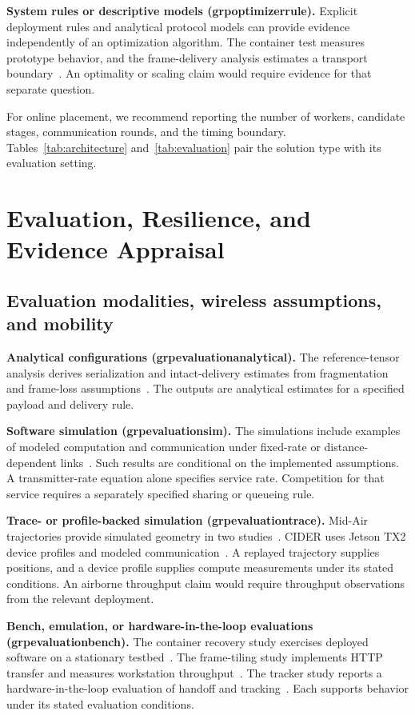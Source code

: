 \documentclass[pdflatex,sn-vancouver-num]{sn-jnl}
\newcommand{\groupcite}[2]{\csname grp#1#2\endcsname}
\begin{document}
\textbf{System rules or descriptive models (\groupcite{optimizer}{rule}).}
Explicit deployment rules and analytical protocol models can provide evidence independently of an optimization algorithm. The container test measures prototype behavior, and the frame-delivery analysis estimates a transport boundary~\cite{R0038,R0121}. An optimality or scaling claim would require evidence for that separate question.

For online placement, we recommend reporting the number of workers, candidate stages, communication rounds, and the timing boundary. Tables~\ref{tab:architecture} and~\ref{tab:evaluation} pair the solution type with its evaluation setting.
\FloatBarrier


\section{Evaluation, Resilience, and Evidence Appraisal}\label{sec:evaluation}
\subsection{Evaluation modalities, wireless assumptions, and mobility}
\textbf{Analytical configurations (\groupcite{evaluation}{analytical}).}
The reference-tensor analysis derives serialization and intact-delivery estimates from fragmentation and frame-loss assumptions~\cite{R0121}. The outputs are analytical estimates for a specified payload and delivery rule.

\textbf{Software simulation (\groupcite{evaluation}{sim}).}
The simulations include examples of modeled computation and communication under fixed-rate or distance-dependent links~\cite{R0015,R0022}. Such results are conditional on the implemented assumptions. A transmitter-rate equation alone specifies service rate. Competition for that service requires a separately specified sharing or queueing rule.

\textbf{Trace- or profile-backed simulation (\groupcite{evaluation}{trace}).}
Mid-Air trajectories provide simulated geometry in two studies~\cite{R0003,R0010}. CIDER uses Jetson TX2 device profiles and modeled communication~\cite{R0075}. A replayed trajectory supplies positions, and a device profile supplies compute measurements under its stated conditions. An airborne throughput claim would require throughput observations from the relevant deployment.

\textbf{Bench, emulation, or hardware-in-the-loop evaluations (\groupcite{evaluation}{bench}).}
The container recovery study exercises deployed software on a stationary testbed~\cite{R0038}. The frame-tiling study implements HTTP transfer and measures workstation throughput~\cite{R0125}. The tracker study reports a hardware-in-the-loop evaluation of handoff and tracking~\cite{R0292}. Each supports behavior under its stated evaluation conditions.
\end{document}
